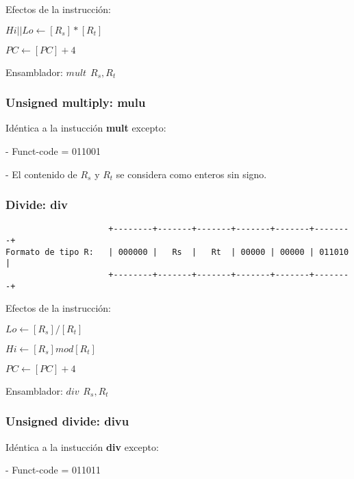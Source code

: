 \documentclass[letterpaper,11pt]{scrartcl}
\begin{document}
Efectos de la instrucción: 

$Hi || Lo \leftarrow [R_{s}] * [R_{t}]$

$PC \leftarrow [PC] + 4$

Ensamblador: $mult\hspace{5pt}R_{s}, R_{t}$


\subsubsection*{Unsigned multiply: \textbf{mulu}}

Idéntica a la instucción \textbf{mult} excepto:

- Funct-code = 011001

- El contenido de $R_{s}$ y $R_{t}$ se considera como enteros sin signo.


\subsubsection*{Divide: \textbf{div}}

\begin{verbatim}
                     +--------+-------+-------+-------+-------+--------+ 
Formato de tipo R:   | 000000 |   Rs  |   Rt  | 00000 | 00000 | 011010 | 
                     +--------+-------+-------+-------+-------+--------+ 
\end{verbatim}

Efectos de la instrucción: 

$Lo \leftarrow [R_{s}] / [R_{t}]$

$Hi \leftarrow [R_{s}] mod [R_{t}]$

$PC \leftarrow [PC] + 4$

Ensamblador: $div\hspace{5pt}R_{s}, R_{t}$


\subsubsection*{Unsigned divide: \textbf{divu}}

Idéntica a la instucción \textbf{div} excepto:

- Funct-code = 011011
\end{document}
